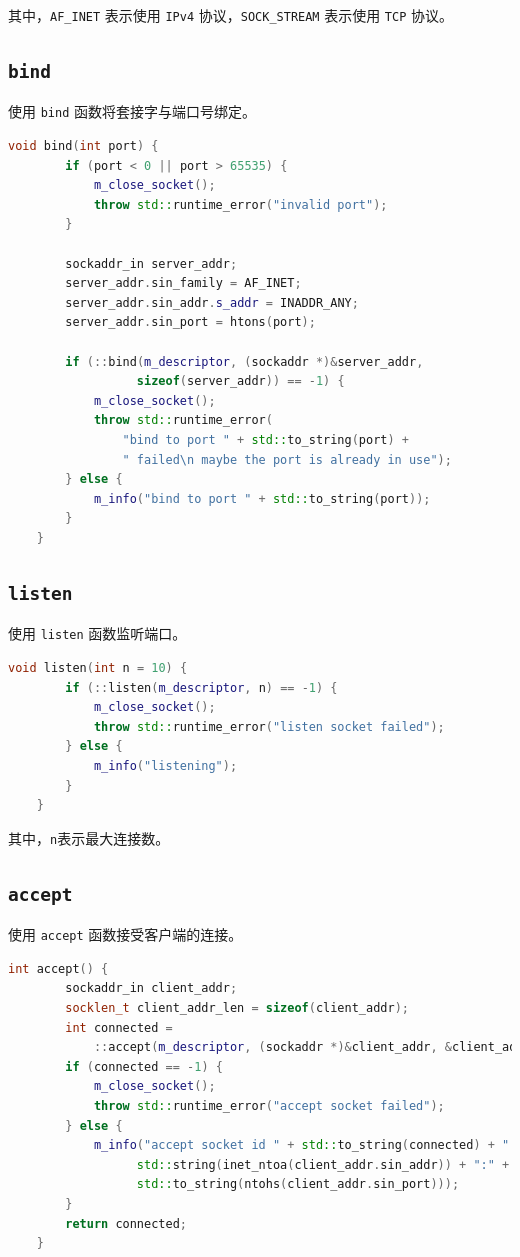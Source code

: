 \documentclass{article}
\begin{document}
其中，\texttt{AF\_INET} 表示使用 \texttt{IPv4} 协议，\texttt{SOCK\_STREAM} 表示使用 \texttt{TCP} 协议。

\subsection{\texttt{bind}}

使用 \texttt{bind} 函数将套接字与端口号绑定。

\begin{lstlisting}[language=C++, title=bind]
    void bind(int port) {
        if (port < 0 || port > 65535) {
            m_close_socket();
            throw std::runtime_error("invalid port");
        }

        sockaddr_in server_addr;
        server_addr.sin_family = AF_INET;
        server_addr.sin_addr.s_addr = INADDR_ANY;
        server_addr.sin_port = htons(port);

        if (::bind(m_descriptor, (sockaddr *)&server_addr,
                  sizeof(server_addr)) == -1) {
            m_close_socket();
            throw std::runtime_error(
                "bind to port " + std::to_string(port) +
                " failed\n maybe the port is already in use");
        } else {
            m_info("bind to port " + std::to_string(port));
        }
    }
\end{lstlisting}

\subsection{\texttt{listen}}

使用 \texttt{listen} 函数监听端口。

\begin{lstlisting}[language=C++, title=listen]
    void listen(int n = 10) {
        if (::listen(m_descriptor, n) == -1) {
            m_close_socket();
            throw std::runtime_error("listen socket failed");
        } else {
            m_info("listening");
        }
    }
\end{lstlisting}

其中，\texttt{n}表示最大连接数。

\subsection{\texttt{accept}}

使用 \texttt{accept} 函数接受客户端的连接。

\begin{lstlisting}[language=C++, title=accept]
    int accept() {
        sockaddr_in client_addr;
        socklen_t client_addr_len = sizeof(client_addr);
        int connected =
            ::accept(m_descriptor, (sockaddr *)&client_addr, &client_addr_len);
        if (connected == -1) {
            m_close_socket();
            throw std::runtime_error("accept socket failed");
        } else {
            m_info("accept socket id " + std::to_string(connected) + " from " +
                  std::string(inet_ntoa(client_addr.sin_addr)) + ":" +
                  std::to_string(ntohs(client_addr.sin_port)));
        }
        return connected;
    }
\end{lstlisting}
\end{document}
